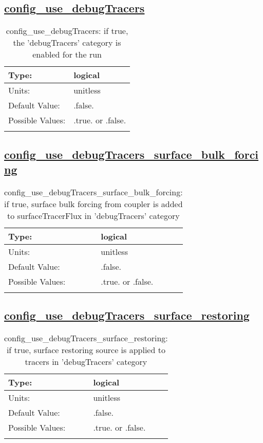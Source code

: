 \subsection[config\_use\_debugTracers]{\hyperref[sec:nm_tab_tracer_forcing_debugTracers]{config\_use\_debugTracers}}
\label{subsec:nm_sec_config_use_debugTracers}
\begin{center}
\begin{longtable}{| p{2.0in} || p{4.0in} |}
    \hline
    Type: & logical \\
    \hline
    Units: & \si{unitless} \\
    \hline
    Default Value: & .false. \\
    \hline
    Possible Values: & .true. or .false. \\
    \hline
    \caption{config\_use\_debugTracers: if true, the 'debugTracers' category is enabled for the run}
\end{longtable}
\end{center}
\subsection[config\_use\_debugTracers\_surface\_bulk\_forcing]{\hyperref[sec:nm_tab_tracer_forcing_debugTracers]{config\_use\_debugTracers\_surface\_bulk\_forcing}}
\label{subsec:nm_sec_config_use_debugTracers_surface_bulk_forcing}
\begin{center}
\begin{longtable}{| p{2.0in} || p{4.0in} |}
    \hline
    Type: & logical \\
    \hline
    Units: & \si{unitless} \\
    \hline
    Default Value: & .false. \\
    \hline
    Possible Values: & .true. or .false. \\
    \hline
    \caption{config\_use\_debugTracers\_surface\_bulk\_forcing: if true, surface bulk forcing from coupler is added to surfaceTracerFlux in 'debugTracers' category}
\end{longtable}
\end{center}
\subsection[config\_use\_debugTracers\_surface\_restoring]{\hyperref[sec:nm_tab_tracer_forcing_debugTracers]{config\_use\_debugTracers\_surface\_restoring}}
\label{subsec:nm_sec_config_use_debugTracers_surface_restoring}
\begin{center}
\begin{longtable}{| p{2.0in} || p{4.0in} |}
    \hline
    Type: & logical \\
    \hline
    Units: & \si{unitless} \\
    \hline
    Default Value: & .false. \\
    \hline
    Possible Values: & .true. or .false. \\
    \hline
    \caption{config\_use\_debugTracers\_surface\_restoring: if true, surface restoring source is applied to tracers in 'debugTracers' category}
\end{longtable}
\end{center}
